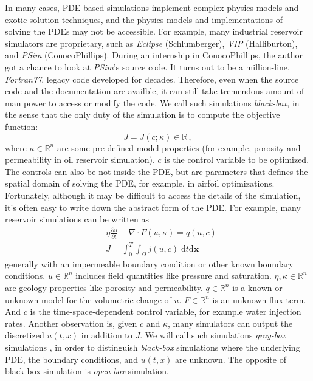 \documentclass[a4paper,onecolumn]{article}
\theoremstyle{remark}
\begin{document}
\noindent In many cases, PDE-based simulations implement complex physics models and exotic solution techniques, and
the physics models and implementations of solving the PDEs may not
be accessible. For example, many industrial reservoir simulators are proprietary, such as \textit{Eclipse} (Schlumberger), 
\textit{VIP} (Halliburton), and \textit{PSim} (ConocoPhillips). During an internship in ConocoPhillips, the author got a chance to
look at \textit{PSim}'s source code. It turns out to be a million-line, \textit{Fortran77}, legacy code developed for decades.
Therefore, even when the source code and the documentation are availble, it can still take tremendous amount of man power
to access or modify the code.
We call such simulations \emph{black-box}, in the sense that the only duty of the simulation is to compute the objective function:
\begin{equation}
    J = J(c;\kappa) \in \mathbb{R}\,,
\end{equation}
where $\kappa\in \mathbb{R}^n$ are some pre-defined model properties (for example, porosity and permeability in oil reservoir simulation).
$c$ is the control variable to be optimized. The controls can also be not inside the PDE,
but are parameters that defines the spatial domain of solving the PDE, for example, 
in airfoil optimizations.
Fortunately, although it may be difficult to access the details of the simulation, it's 
often easy to write down
the abstract form of the PDE. For example, many reservoir simulations can be written as \cite{reservoir simulation book}
\begin{equation}\begin{split}
    &\eta\frac{\partial u}{\partial t} + \nabla \cdot F(u, \kappa) = q(u,c)\\
    &J = \int_0^T\int_\Omega j(u,c) \; \textrm{d}t \textrm{d}\mathbf{x}
\end{split}\end{equation}
generally with an impermeable boundary condition or other known boundary conditions. 
$u\in \mathbb{R}^n$ includes field quantities like pressure and saturation. $\eta, \kappa\in \mathbb{R}^n$ 
are geology properties like porosity and permeability. $q\in \mathbb{R}^n$ is a known or
unknown model for the volumetric change of $u$. 
$F\in \mathbb{R}^n$ is an unknown flux term. And $c$ is the time-space-dependent control variable, for example 
water injection rates. Another observation is, 
given $c$ and $\kappa$, many simulators can output the discretized $u(t,x)$ in addition to $J$.
We will call such simulations \textit{gray-box} simulations \cite{review of black-box modeling}
, in order to distinguish \textit{black-box} simulations where 
the underlying PDE, the boundary conditions, and $u(t,x)$ are unknown.
The opposite of black-box simulation is \emph{open-box} simulation.\\
\end{document}
